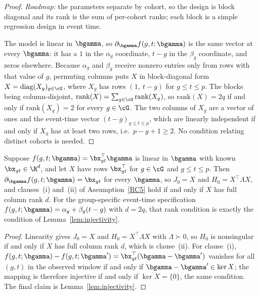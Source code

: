 \documentclass{article}
\begin{document}
\begin{proof}
\textit{Roadmap:} the parameters separate by cohort, so the design is block diagonal and its rank is the sum of per-cohort ranks; each block is a simple regression design in event time.

The model is linear in $\bgamma$, so $\partial_{\bgamma} f(g,t;\bgamma)$ is the same vector at every $\bgamma$: it has a $1$ in the $\alpha_g$ coordinate, $t-g$ in the $\beta_g$ coordinate, and zeros elsewhere. Because $\alpha_g$ and $\beta_g$ receive nonzero entries only from rows with that value of $g$, permuting columns puts $X$ in block-diagonal form $X = \mathrm{diag}(X_g)_{g\in\cG}$, where $X_g$ has rows $(1,\ t-g)$ for $g \leq t \leq p$. The blocks being column-disjoint, $\mathrm{rank}(X) = \sum_{g\in\cG}\mathrm{rank}(X_g)$, so $\mathrm{rank}(X) = 2q$ if and only if $\mathrm{rank}(X_g) = 2$ for every $g \in \cG$. The two columns of $X_g$ are a vector of ones and the event-time vector $(t-g)_{g \leq t \leq p}$, which are linearly independent if and only if $X_g$ has at least two rows, i.e.\ $p-g+1 \geq 2$. No condition relating distinct cohorts is needed.
\end{proof}

\begin{corollary}\label{cor:linear-rank}
Suppose $f(g,t;\bgamma) = \bx_{gt}^{\top}\bgamma$ is linear in $\bgamma$ with known $\bx_{gt} \in \R^{d}$, and let $X$ have rows $\bx_{gt}^{\top}$ for $g \in \cG$ and $g \leq t \leq p$. Then $\partial_{\bgamma} f(g,t;\bgamma) = \bx_{gt}$ for every $\bgamma$, so $J_0 = X$ and $H_0 = X^{\top}\Lambda X$, and clauses~(i) and~(ii) of Assumption~\ref{RC5} hold if and only if $X$ has full column rank $d$. For the group-specific event-time specification $f(g,t;\bgamma) = \alpha_g + \beta_g(t-g)$ with $d = 2q$, that rank condition is exactly the condition of Lemma~\ref{lem:injectivity}.
\end{corollary}

\begin{proof}
Linearity gives $J_0 = X$ and $H_0 = X^{\top}\Lambda X$ with $\Lambda \succ 0$, so $H_0$ is nonsingular if and only if $X$ has full column rank $d$, which is clause~(ii). For clause~(i), $f(g,t;\bgamma) - f(g,t;\bgamma') = \bx_{gt}^{\top}(\bgamma - \bgamma')$ vanishes for all $(g,t)$ in the observed window if and only if $\bgamma - \bgamma' \in \ker X$; the mapping is therefore injective if and only if $\ker X = \{0\}$, the same condition. The final claim is Lemma~\ref{lem:injectivity}.
\end{proof}
\end{document}
